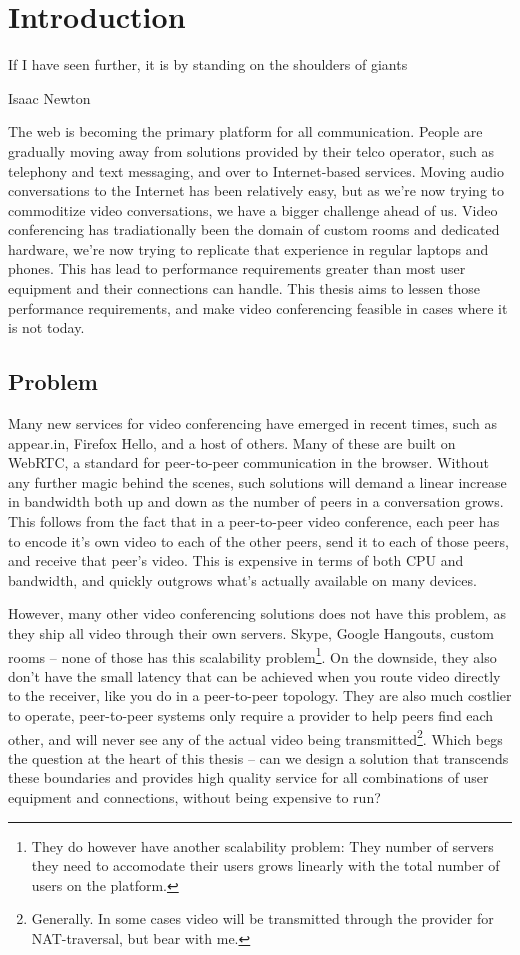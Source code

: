 \chapter{Introduction}\label{chp:introduction}

\epigraph{If I have seen further, it is by standing on the shoulders of giants}{Isaac Newton}

The web is becoming the primary platform for all communication. People are gradually moving away from solutions provided by their telco operator, such as telephony and text messaging, and over to Internet-based services. Moving audio conversations to the Internet has been relatively easy, but as we're now trying to commoditize video conversations, we have a bigger challenge ahead of us. Video conferencing has tradiationally been the domain of custom rooms and dedicated hardware, we're now trying to replicate that experience in regular laptops and phones. This has lead to performance requirements greater than most user equipment and their connections can handle. This thesis aims to lessen those performance requirements, and make video conferencing feasible in cases where it is not today.


\section{Problem}

Many new services for video conferencing have emerged in recent times, such as appear.in, Firefox Hello, and a host of others. Many of these are built on WebRTC, a standard for peer-to-peer communication in the browser. Without any further magic behind the scenes, such solutions will demand a linear increase in bandwidth both up and down as the number of peers in a conversation grows. This follows from the fact that in a peer-to-peer video conference, each peer has to encode it's own video to each of the other peers, send it to each of those peers, and receive that peer's video. This is expensive in terms of both CPU and bandwidth, and quickly outgrows what's actually available on many devices.

However, many other video conferencing solutions does not have this problem, as they ship all video through their own servers. Skype, Google Hangouts, custom rooms -- none of those has this scalability problem\footnote{They do however have another scalability problem: They number of servers they need to accomodate their users grows linearly with the total number of users on the platform.}. On the downside, they also don't have the small latency that can be achieved when you route video directly to the receiver, like you do in a peer-to-peer topology. They are also much costlier to operate, peer-to-peer systems only require a provider to help peers find each other, and will never see any of the actual video being transmitted\footnote{Generally. In some cases video will be transmitted through the provider for NAT-traversal, but bear with me.}. Which begs the question at the heart of this thesis -- can we design a solution that transcends these boundaries and provides high quality service for all combinations of user equipment and connections, without being expensive to run?

